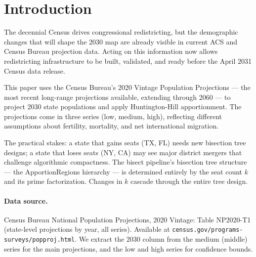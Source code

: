 \section{Introduction}

The decennial Census drives congressional redistricting, but the demographic changes
that will shape the 2030 map are already visible in current ACS and Census Bureau
projection data. Acting on this information now allows redistricting infrastructure
to be built, validated, and ready before the April 2031 Census data release.

This paper uses the Census Bureau's 2020 Vintage Population Projections --- the
most recent long-range projections available, extending through 2060 --- to project
2030 state populations and apply Huntington-Hill apportionment. The projections come
in three series (low, medium, high), reflecting different assumptions about fertility,
mortality, and net international migration.

The practical stakes: a state that gains seats (TX, FL) needs new bisection tree
designs; a state that loses seats (NY, CA) may see major district mergers that
challenge algorithmic compactness. The bisect pipeline's bisection tree structure
--- the ApportionRegions hierarchy --- is determined entirely by the seat count $k$
and its prime factorization. Changes in $k$ cascade through the entire tree design.

\paragraph{Data source.}
Census Bureau National Population Projections, 2020 Vintage: Table NP2020-T1
(state-level projections by year, all series). Available at
\texttt{census.gov/programs-surveys/popproj.html}. We extract the 2030 column
from the medium (middle) series for the main projections, and the low and high
series for confidence bounds.
